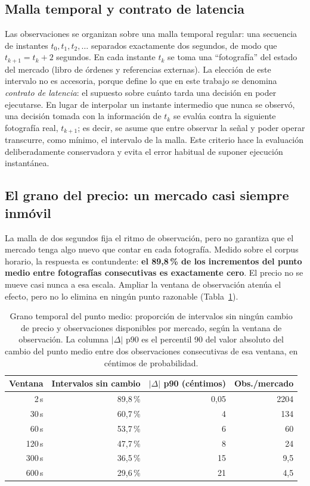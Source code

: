 \subsection{Malla temporal y contrato de latencia}

Las observaciones se organizan sobre una malla temporal regular: una secuencia de instantes
$t_0, t_1, t_2, \dots$ separados exactamente dos segundos, de modo que $t_{k+1} = t_k + 2$
segundos. En cada instante $t_k$ se toma una ``fotografía'' del estado del mercado (libro de
órdenes y referencias externas). La elección de este intervalo no es accesoria, porque define
lo que en este trabajo se denomina \emph{contrato de latencia}: el supuesto sobre cuánto
tarda una decisión en poder ejecutarse. En lugar de interpolar un instante intermedio que
nunca se observó, una decisión tomada con la información de $t_k$ se evalúa contra la
siguiente fotografía real, $t_{k+1}$; es decir, se asume que entre observar la señal y poder
operar transcurre, como mínimo, el intervalo de la malla. Este criterio hace la evaluación
deliberadamente conservadora y evita el error habitual de suponer ejecución instantánea.

\subsection{El grano del precio: un mercado casi siempre inmóvil}
\label{sec::grano_temporal}

La malla de dos segundos fija el ritmo de observación, pero no garantiza que el mercado
tenga algo nuevo que contar en cada fotografía. Medido sobre el corpus horario, la
respuesta es contundente: \textbf{el 89,8\,\% de los incrementos del punto medio entre
fotografías consecutivas es exactamente cero}. El precio no se mueve casi nunca a esa
escala. Ampliar la ventana de observación atenúa el efecto, pero no lo elimina en ningún
punto razonable (Tabla~\ref{tab::grano}).

\begin{table}[h]
\centering
\caption[Grano temporal del punto medio según la ventana de observación]{Grano temporal del
punto medio: proporción de intervalos sin ningún cambio de precio y observaciones
disponibles por mercado, según la ventana de observación. La columna
$|\Delta|$ p90 es el percentil 90 del valor absoluto del cambio del punto medio entre dos
observaciones consecutivas de esa ventana, en céntimos de probabilidad.}
\label{tab::grano}
\begin{tabular}{rrrr}
\toprule
\textbf{Ventana} & \textbf{Intervalos sin cambio} & \textbf{$|\Delta|$ p90 (céntimos)} & \textbf{Obs./mercado} \\
\midrule
2\,s   & 89,8\,\% & 0,05 & 2204 \\
30\,s  & 60,7\,\% & 4    & 134 \\
60\,s  & 53,7\,\% & 6    & 60 \\
120\,s & 47,7\,\% & 8    & 24 \\
300\,s & 36,5\,\% & 15   & 9,5 \\
600\,s & 29,6\,\% & 21   & 4,5 \\
\bottomrule
\end{tabular}
\end{table}

